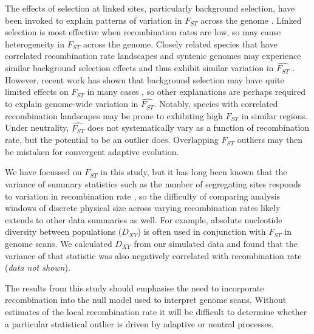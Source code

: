 \documentclass[9pt,twocolumn,twoside]{pnas-new}
\begin{document}
The effects of selection at linked sites, particularly background selection, have been invoked to explain patterns of variation in $F_{ST}$ across the genome \cite{Cruickshank2014-ps,Burri2017-ay}. Linked selection is most effective when recombination rates are low, so may cause heterogeneity in $F_{ST}$ across the genome. Closely related species that have correlated recombination rate landscapes and syntenic genomes may experience similar background selection effects and thus exhibit similar variation in $\hat{F_{ST}}$ \cite{Burri2017-ay}. However, recent work has shown that background selection may have quite limited effects on $F_{ST}$ in many cases \cite{matthey2019background}, so other explanations are perhaps required to explain genome-wide variation in $\hat{F_{ST}}$. Notably, species with correlated recombination landscapes may be prone to exhibiting high $F_{ST}$ in similar regions. Under neutrality, $\hat{F_{ST}}$ does not systematically vary as a function of recombination rate, but the potential to be an outlier does. Overlapping $F_{ST}$ outliers may then be mistaken for convergent adaptive evolution. 

We have focussed on $F_{ST}$ in this study, but it has long been known that the variance of summary statistics such as the number of segregating sites responds to variation in recombination rate \cite{Wakeley2009}, so the  difficulty of comparing analysis windows of discrete physical size across varying recombination rates likely extends to other data summaries as well. For example, absolute nucleotide diversity between populations ($D_{XY}$) is often used in conjunction with $F_{ST}$ in genome scans. We calculated $D_{XY}$ from our simulated data and found that the variance of that statistic was also negatively correlated with recombination rate (\textit{data not shown}). 

The results from this study should emphasise the need to incorporate recombination into the null model used to interpret genome scans. Without estimates of the local recombination rate it will be difficult to determine whether a particular statistical outlier is driven by adaptive or neutral processes. 
\end{document}
